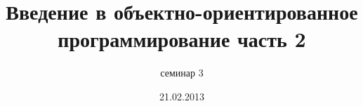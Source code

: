 \documentclass[hyperref={unicode,colorlinks=true,urlbordercolor=blue,linkcolor=blue,urlcolor=blue,pdfborderstyle={/S/U/W 1}}]{beamer}
\title{Введение в объектно-ориентированное программирование часть 2}
\subtitle{семинар 3}
\date{21.02.2013}
\begin{document}
\frame{\titlepage}


\end{document}
